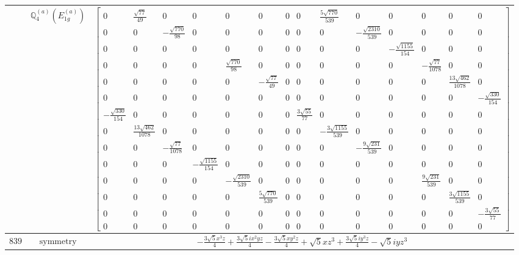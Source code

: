 \documentclass[fleqn,8pt,landscape]{jsarticle}
\begin{document}
\begin{longtable}{ccc}
$  $ & $ \mathbb{Q}_{4}^{(a)}(E_{1g}^{(a)}) $ & $ \begin{bmatrix} 0 & \frac{\sqrt{77}}{49} & 0 & 0 & 0 & 0 & 0 & 0 & \frac{5 \sqrt{770}}{539} & 0 & 0 & 0 & 0 & 0 \\ 0 & 0 & - \frac{\sqrt{770}}{98} & 0 & 0 & 0 & 0 & 0 & 0 & - \frac{\sqrt{2310}}{539} & 0 & 0 & 0 & 0 \\ 0 & 0 & 0 & 0 & 0 & 0 & 0 & 0 & 0 & 0 & - \frac{\sqrt{1155}}{154} & 0 & 0 & 0 \\ 0 & 0 & 0 & 0 & \frac{\sqrt{770}}{98} & 0 & 0 & 0 & 0 & 0 & 0 & - \frac{\sqrt{77}}{1078} & 0 & 0 \\ 0 & 0 & 0 & 0 & 0 & - \frac{\sqrt{77}}{49} & 0 & 0 & 0 & 0 & 0 & 0 & \frac{13 \sqrt{462}}{1078} & 0 \\ 0 & 0 & 0 & 0 & 0 & 0 & 0 & 0 & 0 & 0 & 0 & 0 & 0 & - \frac{\sqrt{330}}{154} \\ - \frac{\sqrt{330}}{154} & 0 & 0 & 0 & 0 & 0 & 0 & \frac{3 \sqrt{55}}{77} & 0 & 0 & 0 & 0 & 0 & 0 \\ 0 & \frac{13 \sqrt{462}}{1078} & 0 & 0 & 0 & 0 & 0 & 0 & - \frac{3 \sqrt{1155}}{539} & 0 & 0 & 0 & 0 & 0 \\ 0 & 0 & - \frac{\sqrt{77}}{1078} & 0 & 0 & 0 & 0 & 0 & 0 & - \frac{9 \sqrt{231}}{539} & 0 & 0 & 0 & 0 \\ 0 & 0 & 0 & - \frac{\sqrt{1155}}{154} & 0 & 0 & 0 & 0 & 0 & 0 & 0 & 0 & 0 & 0 \\ 0 & 0 & 0 & 0 & - \frac{\sqrt{2310}}{539} & 0 & 0 & 0 & 0 & 0 & 0 & \frac{9 \sqrt{231}}{539} & 0 & 0 \\ 0 & 0 & 0 & 0 & 0 & \frac{5 \sqrt{770}}{539} & 0 & 0 & 0 & 0 & 0 & 0 & \frac{3 \sqrt{1155}}{539} & 0 \\ 0 & 0 & 0 & 0 & 0 & 0 & 0 & 0 & 0 & 0 & 0 & 0 & 0 & - \frac{3 \sqrt{55}}{77} \\ 0 & 0 & 0 & 0 & 0 & 0 & 0 & 0 & 0 & 0 & 0 & 0 & 0 & 0 \end{bmatrix} $ \\ \hline
$ 839 $ & $ \text{symmetry} $ & $ - \frac{3 \sqrt{5} x^{3} z}{4} + \frac{3 \sqrt{5} i x^{2} y z}{4} - \frac{3 \sqrt{5} x y^{2} z}{4} + \sqrt{5} x z^{3} + \frac{3 \sqrt{5} i y^{3} z}{4} - \sqrt{5} i y z^{3} $ \\

\end{longtable}
\end{document}
